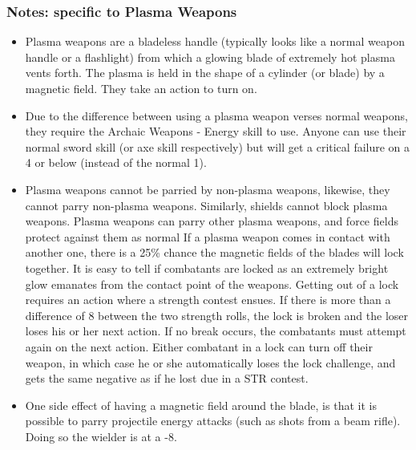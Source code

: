 \subsubsection{Notes: specific to Plasma Weapons}
\begin{itemize}
\item Plasma weapons are a bladeless handle (typically looks like a
  normal weapon handle or a flashlight) from which a glowing blade of
  extremely hot plasma vents forth.  The plasma is held in the shape
  of a cylinder (or blade) by a magnetic field. They take an action to
  turn on.
\item Due to the difference between using a plasma weapon verses
  normal weapons, they require the Archaic Weapons - Energy skill to
  use. Anyone can use their normal sword skill (or axe skill
  respectively) but will get a critical failure on a 4 or below
  (instead of the normal 1).
\item Plasma weapons cannot be parried by non-plasma weapons,
  likewise, they cannot parry non-plasma weapons.  Similarly, shields
  cannot block plasma weapons.  Plasma weapons can parry other plasma
  weapons, and force fields protect against them as normal If a plasma
  weapon comes in contact with another one, there is a 25\% chance the
  magnetic fields of the blades will lock together. It is easy to tell
  if combatants are locked as an extremely bright glow emanates from
  the contact point of the weapons. Getting out of a lock requires an
  action where a strength contest ensues.  If there is more than a
  difference of 8 between the two strength rolls, the lock is broken
  and the loser loses his or her next action.  If no break occurs, the
  combatants must attempt again on the next action. Either combatant
  in a lock can turn off their weapon, in which case he or she
  automatically loses the lock challenge, and gets the same negative
  as if he lost due in a STR contest.
\item One side effect of having a magnetic field around the blade, is
  that it is possible to parry projectile energy attacks (such as
  shots from a beam rifle).  Doing so the wielder is at a -8.

\end{itemize}